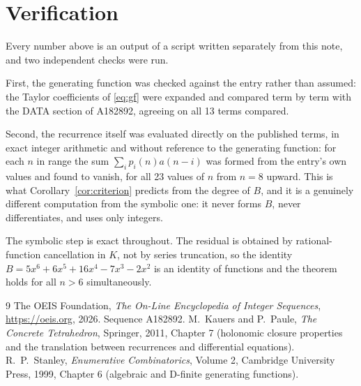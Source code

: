 \documentclass[11pt,a4paper]{article}
\theoremstyle{plain}
\theoremstyle{definition}
\begin{document}
\section{Verification}

Every number above is an output of a script written separately from this note, and two
independent checks were run.

First, the generating function was checked against the entry rather than assumed: the
Taylor coefficients of \eqref{eq:gf} were expanded and compared term by term with the DATA
section of A182892, agreeing on all 13 terms compared.

Second, the recurrence itself was evaluated directly on the published terms, in exact
integer arithmetic and without reference to the generating function: for each $n$ in range
the sum $\sum_{i}p_{i}(n)a(n-i)$ was formed from the entry's own values and found to
vanish, for all 23 values of $n$ from $n=8$ upward. This is what
Corollary~\ref{cor:criterion} predicts from the degree of $B$, and it is a genuinely
different computation from the symbolic one: it never forms $B$, never differentiates, and
uses only integers.

The symbolic step is exact throughout. The residual is obtained by rational-function
cancellation in $K$, not by series truncation, so the identity $B=5 x^{6} + 6 x^{5} + 16 x^{4} - 7 x^{3} - 2 x^{2}$ is an
identity of functions and the theorem holds for all $n>6$ simultaneously.

\begin{thebibliography}{9}
 The OEIS Foundation, \emph{The On-Line Encyclopedia of Integer Sequences},
\url{https://oeis.org}, 2026. Sequence A182892.
 M.~Kauers and P.~Paule, \emph{The Concrete Tetrahedron}, Springer, 2011,
Chapter 7 (holonomic closure properties and the translation between recurrences and
differential equations).
 R.~P.~Stanley, \emph{Enumerative Combinatorics}, Volume 2, Cambridge
University Press, 1999, Chapter 6 (algebraic and D-finite generating functions).
\end{thebibliography}
\end{document}
